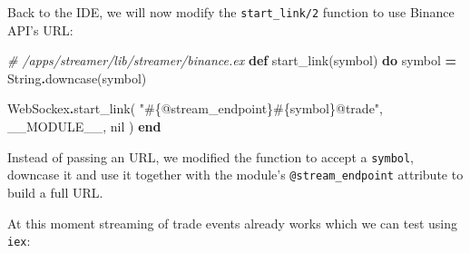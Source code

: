 \documentclass[
  oneside]{book}
\newenvironment{Shaded}{\begin{snugshade}}{\end{snugshade}}
\newcommand{\CommentTok}[1]{\textcolor[rgb]{0.56,0.35,0.01}{\textit{#1}}}
\newcommand{\ConstantTok}[1]{\textcolor[rgb]{0.00,0.00,0.00}{#1}}
\newcommand{\KeywordTok}[1]{\textcolor[rgb]{0.13,0.29,0.53}{\textbf{#1}}}
\newcommand{\NormalTok}[1]{#1}
\newcommand{\OperatorTok}[1]{\textcolor[rgb]{0.81,0.36,0.00}{\textbf{#1}}}
\newcommand{\OtherTok}[1]{\textcolor[rgb]{0.56,0.35,0.01}{#1}}
\newcommand{\StringTok}[1]{\textcolor[rgb]{0.31,0.60,0.02}{#1}}
\begin{document}
Back to the IDE, we will now modify the \texttt{start\_link/2} function to use Binance API's URL:

\begin{Shaded}
\begin{Highlighting}[]
  \CommentTok{\# /apps/streamer/lib/streamer/binance.ex}
  \KeywordTok{def}\NormalTok{ start\_link(symbol) }\KeywordTok{do}
\NormalTok{    symbol }\OperatorTok{=} \ConstantTok{String}\OperatorTok{.}\NormalTok{downcase(symbol)}

    \ConstantTok{WebSockex}\OperatorTok{.}\NormalTok{start\_link(}
      \StringTok{"}\OtherTok{\#\{@stream\_endpoint\}\#\{}\NormalTok{symbol}\OtherTok{\}}\StringTok{@trade"}\NormalTok{,}
      \ConstantTok{\_\_MODULE\_\_}\NormalTok{,}
      \ConstantTok{nil}
\NormalTok{    )}
  \KeywordTok{end}
\end{Highlighting}
\end{Shaded}

Instead of passing an URL, we modified the function to accept a \texttt{symbol}, downcase it and use it together with the module's \texttt{@stream\_endpoint} attribute to build a full URL.

At this moment streaming of trade events already works which we can test using \texttt{iex}:
\end{document}
